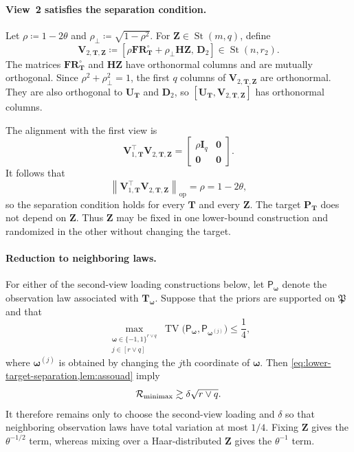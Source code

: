 \documentclass[11pt]{article}
\newcommand{\trans}{\top}
\newcommand{\opn}[1]{\left\lVert #1\right\rVert_{\mathrm{op}}}
\begin{document}
\paragraph{View~2 satisfies the separation condition.}
Let
$\rho\coloneqq1-2\theta$ and
$\rho_\perp\coloneqq\sqrt{1-\rho^2}$.  For
$\bm Z\in\operatorname{St}(m,q)$, define
\begin{equation}
\label{eq:lower-view-two-frame}
  \bm V_{2,\bm T,\bm Z}
  \coloneqq
  \left[
    \rho\bm F\bm R_{\bm T}^{\circ}
    +
    \rho_\perp\bm H\bm Z,\,
    \bm D_2
  \right]
  \in\operatorname{St}(n,r_2).
\end{equation}
The matrices $\bm F\bm R_{\bm T}^{\circ}$ and $\bm H\bm Z$ have
orthonormal columns and are mutually orthogonal.  Since
$\rho^2+\rho_\perp^2=1$, the first $q$ columns of
$\bm V_{2,\bm T,\bm Z}$ are orthonormal.  They are also orthogonal to
$\bm U_{\bm T}$ and $\bm D_2$, so
$[\bm U_{\bm T},\bm V_{2,\bm T,\bm Z}]$ has orthonormal columns.

The alignment with the first view is
\[
  \bm V_{1,\bm T}^\trans
  \bm V_{2,\bm T,\bm Z}
  =
  \begin{bmatrix}
    \rho\bm I_q&\bm 0\\
    \bm 0&\bm 0
  \end{bmatrix}.
\]
It follows that
\[
  \opn{
    \bm V_{1,\bm T}^\trans
    \bm V_{2,\bm T,\bm Z}
  }
  =
  \rho
  =
  1-2\theta,
\]
so the separation condition holds for every $\bm T$ and every $\bm Z$.
The target $\bm P_{\bm T}$ does not depend on $\bm Z$.  Thus $\bm Z$
may be fixed in one lower-bound construction and randomized in the other
without changing the target.

\paragraph{Reduction to neighboring laws.}
For either of the second-view loading constructions below, let
$\mathsf P_{\bm\omega}$ denote the observation law associated with
$\bm T_{\bm\omega}$.  Suppose that the priors are supported on
$\mathfrak P$ and that
\[
  \max_{\substack{
    \bm\omega\in\{-1,1\}^{r\vee q}\\
    j\in[r\vee q]
  }}
  \operatorname{TV}\bigl(
    \mathsf P_{\bm\omega},
    \mathsf P_{\bm\omega^{(j)}}
  \bigr)
  \le\frac14,
\]
where $\bm\omega^{(j)}$ is obtained by changing the $j$th coordinate of
$\bm\omega$.  Then \cref{eq:lower-target-separation,lem:assouad} imply
\begin{equation}
\label{eq:lower-assouad-reduction}
  \mathcal{R}_{\rm minimax}
  \gtrsim
  \delta\sqrt{r\vee q}.
\end{equation}
It therefore remains only to choose the second-view loading and $\delta$ so
that neighboring observation laws have total variation at most $1/4$.
Fixing $\bm Z$ gives the $\theta^{-1/2}$ term, whereas mixing over a
Haar-distributed $\bm Z$ gives the $\theta^{-1}$ term.
\end{document}
